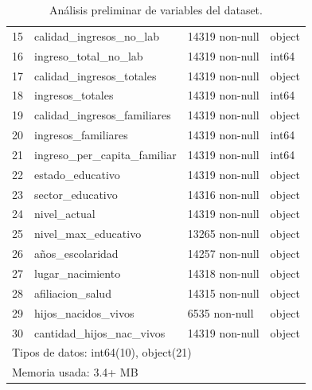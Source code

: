 \documentclass[a4paper]{article}
\begin{document}
\begin{table}[H]
\begin{center}
\begin{tabular}{clll}
    15 & calidad\_ingresos\_no\_lab     & 14319 non-null & object \\
    16 & ingreso\_total\_no\_lab        & 14319 non-null & int64  \\
    17 & calidad\_ingresos\_totales    & 14319 non-null & object \\
    18 & ingresos\_totales            & 14319 non-null & int64  \\
    19 & calidad\_ingresos\_familiares & 14319 non-null & object \\
    20 & ingresos\_familiares         & 14319 non-null & int64  \\
    21 & ingreso\_per\_capita\_familiar & 14319 non-null & int64  \\
    22 & estado\_educativo            & 14319 non-null & object \\
    23 & sector\_educativo            & 14316 non-null & object \\
    24 & nivel\_actual                & 14319 non-null & object \\
    25 & nivel\_max\_educativo         & 13265 non-null & object \\
    26 & años\_escolaridad            & 14257 non-null & object \\
    27 & lugar\_nacimiento            & 14318 non-null & object \\
    28 & afiliacion\_salud            & 14315 non-null & object \\
    29 & hijos\_nacidos\_vivos         & 6535 non-null  & object \\
    30 & cantidad\_hijos\_nac\_vivos    & 14319 non-null & object \\
    \multicolumn{4}{l}{Tipos de datos: int64(10), object(21)}  \\
    \multicolumn{4}{l}{Memoria usada: 3.4+ MB} \\
    \end{tabular}\end{center}
    \caption{Análisis preliminar de variables del dataset.}
    \label{Preliminar dataset analysis}
    \end{table}
       
\end{document}
